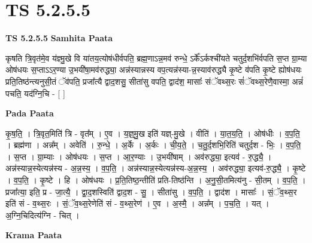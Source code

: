 \documentclass[17pt]{extarticle}
\begin{document}
\section{ TS 5.2.5.5 }

\textbf{TS 5.2.5.5 } \newline
\textbf{Samhita Paata} \newline

कृषति त्रि॒वृत॑मे॒व य॑ज्ञ्मु॒खे वि या॑तय॒त्योष॑धीर्वपति॒ ब्रह्म॒णाऽन्न॒मव॑ रुन्धे॒ ऽर्के᳚ऽर्कश्ची॑यते चतुर्द॒शभि॑र्वपति स॒प्त ग्रा॒म्या ओष॑धयः स॒प्ताऽऽर॒ण्या उ॒भयी॑षा॒मव॑रुद्ध्या॒ अन्न॑स्यान्नस्य वप॒त्यन्न॑स्या-न्न॒स्याव॑रुद्ध्यै कृ॒ष्टे व॑पति कृ॒ष्टे ह्योष॑धयः प्रति॒तिष्ठ॑न्त्यनुसी॒तं ॅव॑पति॒ प्रजा᳚त्यै द्वाद॒शसु॒ सीता॑सु वपति॒ द्वाद॑श॒ मासाः᳚ संॅवथ्स॒रः सं॑ॅवथ्स॒रेणै॒वास्मा॒ अन्नं॑ पचति॒ यद॑ग्नि॒चि - [  ] \newline

\textbf{Pada Paata} \newline

कृ॒ष॒ति॒ । त्रि॒वृत॒मिति॑ त्रि - वृत᳚म् । ए॒व । य॒ज्ञ्॒मु॒ख इति॑ यज्ञ्-मु॒खे । वीति॑ । या॒त॒य॒ति॒ । ओष॑धीः । व॒प॒ति॒ । ब्रह्म॑णा । अन्न᳚म् । अवेति॑ । रु॒न्धे॒ । अ॒र्के । अ॒र्कः । ची॒य॒ते॒ । च॒तु॒र्द॒शभि॒रिति॑ चतुर्द॒श - भिः॒ । व॒प॒ति॒ । स॒प्त । ग्रा॒म्याः । ओष॑धयः । स॒प्त । आ॒र॒ण्याः । उ॒भयी॑षाम् । अव॑रुद्ध्या॒ इत्यव॑ - रु॒द्ध्यै॒ । अन्न॑स्यान्न॒स्येत्यन्न॑स्य - अ॒न्न॒स्य॒ । व॒प॒ति॒ । अन्न॑स्यान्न॒स्येत्यन्न॑स्य-अ॒न्न॒स्य॒ । अव॑रुद्ध्या॒ इत्यव॑-रु॒द्ध्यै॒ । कृ॒ष्टे । व॒प॒ति॒ । कृ॒ष्टे । हि । ओष॑धयः । प्र॒ति॒तिष्ठ॒न्तीति॑ प्रति-तिष्ठ॑न्ति । अ॒नु॒सी॒तमित्य॑नु - सी॒तम् । व॒प॒ति॒ । प्रजा᳚त्या॒ इति॒ प्र - जा॒त्यै॒ । द्वा॒द॒शस्विति॑ द्वाद॒श - सु॒ । सीता॑सु । व॒प॒ति॒ । द्वाद॑श । मासाः᳚ । सं॒ॅव॒थ्स॒र इति॑ सं - व॒थ्स॒रः । सं॒ॅव॒थ्स॒रेणेति॑ सं - व॒थ्स॒रेण॑ । ए॒व । अ॒स्मै॒ । अन्न᳚म् । प॒च॒ति॒ । यत् । अ॒ग्नि॒चिदित्य॑ग्नि - चित् ।  \newline


\textbf{Krama Paata} \newline
\end{document}
